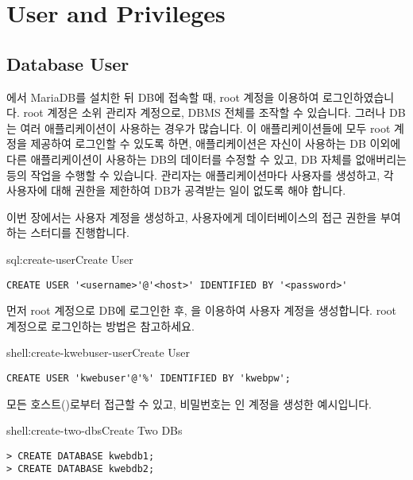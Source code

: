 \section{User and Privileges}\label{sect:user-and-privileges}

\subsection*{Database User}

에서 MariaDB를 설치한 뒤 DB에 접속할 때, root 계정을 이용하여 로그인하였습니다. root 계정은 소위 관리자 계정으로, DBMS 전체를 조작할 수 있습니다. 그러나 DB는 여러 애플리케이션이 사용하는 경우가 많습니다. 이 애플리케이션들에 모두 root 계정을 제공하여 로그인할 수 있도록 하면, 애플리케이션은 자신이 사용하는 DB 이외에 다른 애플리케이션이 사용하는 DB의 데이터를 수정할 수 있고, DB 자체를 없애버리는 등의 작업을 수행할 수 있습니다. 관리자는 애플리케이션마다 사용자를 생성하고, 각 사용자에 대해 권한을 제한하여 DB가 공격받는 일이 없도록 해야 합니다.

이번 장에서는 사용자 계정을 생성하고, 사용자에게 데이터베이스의 접근 권한을 부여하는 스터디를 진행합니다.

\begin{sqlenv}{sql:create-user}{Create User}\begin{verbatim}
CREATE USER '<username>'@'<host>' IDENTIFIED BY '<password>'
\end{verbatim}
\end{sqlenv}

먼저 root 계정으로 DB에 로그인한 후, 을 이용하여 사용자 계정을 생성합니다. root 계정으로 로그인하는 방법은 \과 \을 참고하세요.

\begin{sqlenv}{shell:create-kwebuser-user}{Create  User}\begin{verbatim}
CREATE USER 'kwebuser'@'%' IDENTIFIED BY 'kwebpw';
\end{verbatim}
\end{sqlenv}

\는 모든 호스트(\cd{\%})로부터 접근할 수 있고, 비밀번호는 인  계정을 생성한 예시입니다.

\begin{shellenv}{shell:create-two-dbs}{Create Two DBs}\begin{verbatim}
> CREATE DATABASE kwebdb1;
> CREATE DATABASE kwebdb2;
\end{verbatim}
\end{shellenv}

